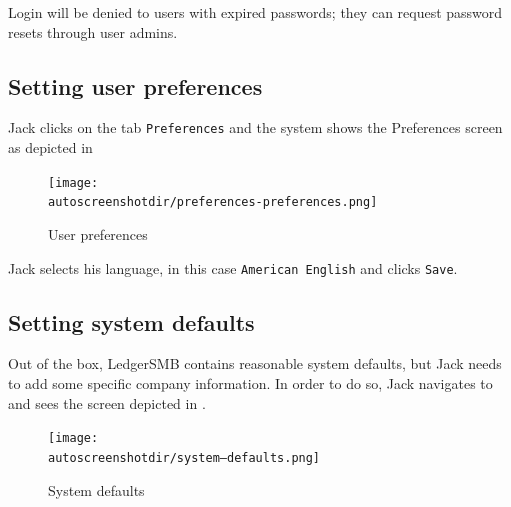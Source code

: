 Login will be denied to users with expired passwords; they can request
password resets through user admins.

\subsection{Setting user preferences}
\label{subsec-setting-user-preferences}

Jack clicks on the tab \texttt{Preferences} and the system shows the Preferences screen 
as depicted in 

\begin{figure}[H]
        \centering
        \texttt{[image: \\autoscreenshotdir/preferences-preferences.png]}
        \caption{User preferences}
        \label{fig:first-user-preferences}
\end{figure}

Jack selects his language, in this case \texttt{American English} and clicks \texttt{Save}.

\subsection{Setting system defaults}
\label{subsec-setting-system-defaults}

Out of the box, LedgerSMB contains reasonable system defaults, but Jack needs to add some specific company information.
In order to do so, Jack navigates to  and sees the screen depicted in .

\begin{figure}[H]
        \centering
        \texttt{[image: \\autoscreenshotdir/system--defaults.png]}
        \caption{System defaults}
        \label{fig:first-user-system-defaults}
\end{figure}

